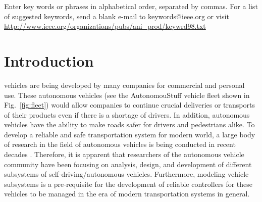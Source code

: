 \documentclass[journal,twoside,web]{ieeecolor}
\begin{document}
\begin{IEEEkeywords}
Enter key words or phrases in alphabetical 
order, separated by commas. For a list of suggested keywords, send a blank 
e-mail to keywords@ieee.org or visit \underline
{http://www.ieee.org/organizations/pubs/ani\_prod/keywrd98.txt}
\end{IEEEkeywords}

\section{Introduction}
\label{sec:introduction}
 vehicles are being developed by many companies for commercial and
personal use. These autonomous vehicles (see the AutonomouStuff vehicle fleet
shown in Fig.~\ref{fig:fleet}) would allow companies to continue crucial deliveries
or transports of their products even if there is a shortage of drivers. In
addition, autonomous vehicles have the ability to make roads safer for drivers
and pedestrians alike. To develop a reliable and safe transportation system for
modern world, a large body of research in the field of autonomous vehicles is
being conducted in recent decades \cite{Liu2017} \cite{Prasad2020}.
Therefore, it is apparent that researchers of the autonomous vehicle community
have been focusing on analysis, design, and development of different subsystems
of self-driving/autonomous vehicles. Furthermore, modeling vehicle subsystems is
a pre-requisite for the development of reliable controllers for these vehicles
to be managed in the era of modern transportation systems in general.

\end{document}
